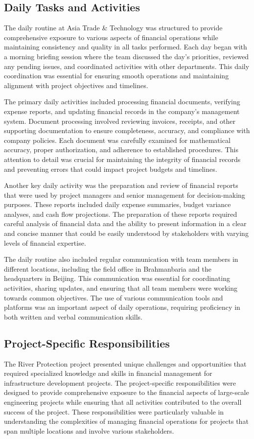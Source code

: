 \subsection{Daily Tasks and Activities}
The daily routine at Asia Trade \& Technology was structured to provide comprehensive exposure to various aspects of financial operations while maintaining consistency and quality in all tasks performed. Each day began with a morning briefing session where the team discussed the day's priorities, reviewed any pending issues, and coordinated activities with other departments. This daily coordination was essential for ensuring smooth operations and maintaining alignment with project objectives and timelines.

The primary daily activities included processing financial documents, verifying expense reports, and updating financial records in the company's management system. Document processing involved reviewing invoices, receipts, and other supporting documentation to ensure completeness, accuracy, and compliance with company policies. Each document was carefully examined for mathematical accuracy, proper authorization, and adherence to established procedures. This attention to detail was crucial for maintaining the integrity of financial records and preventing errors that could impact project budgets and timelines.

Another key daily activity was the preparation and review of financial reports that were used by project managers and senior management for decision-making purposes. These reports included daily expense summaries, budget variance analyses, and cash flow projections. The preparation of these reports required careful analysis of financial data and the ability to present information in a clear and concise manner that could be easily understood by stakeholders with varying levels of financial expertise.

The daily routine also included regular communication with team members in different locations, including the field office in Brahmanbaria and the headquarters in Beijing. This communication was essential for coordinating activities, sharing updates, and ensuring that all team members were working towards common objectives. The use of various communication tools and platforms was an important aspect of daily operations, requiring proficiency in both written and verbal communication skills.

\subsection{Project-Specific Responsibilities}
The River Protection project presented unique challenges and opportunities that required specialized knowledge and skills in financial management for infrastructure development projects. The project-specific responsibilities were designed to provide comprehensive exposure to the financial aspects of large-scale engineering projects while ensuring that all activities contributed to the overall success of the project. These responsibilities were particularly valuable in understanding the complexities of managing financial operations for projects that span multiple locations and involve various stakeholders.

